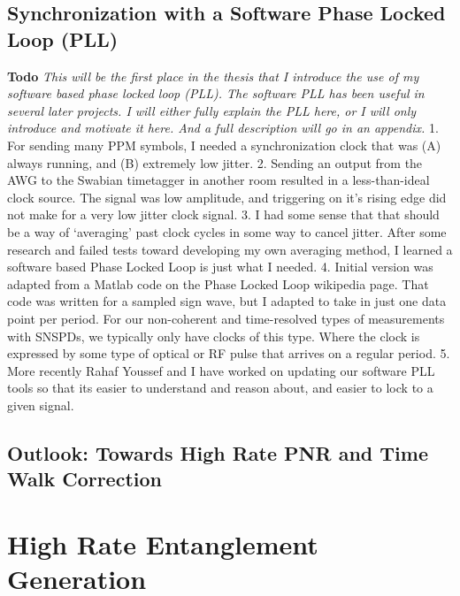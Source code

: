 \documentclass[11pt]{caltech_thesis} %
\begin{document}
{}

\hypertarget{synchronization-with-a-software-phase-locked-loop-pll}{%
\section{Synchronization with a Software Phase Locked Loop
(PLL)}\label{synchronization-with-a-software-phase-locked-loop-pll}}

\textbf{Todo} \emph{This will be the first place in the thesis that I
introduce the use of my software based phase locked loop (PLL). The
software PLL has been useful in several later projects. I will either
fully explain the PLL here, or I will only introduce and motivate it
here. And a full description will go in an appendix. } 1. For sending
many PPM symbols, I needed a synchronization clock that was (A) always
running, and (B) extremely low jitter. 2. Sending an output from the AWG
to the Swabian timetagger in another room resulted in a less-than-ideal
clock source. The signal was low amplitude, and triggering on it's
rising edge did not make for a very low jitter clock signal. 3. I had
some sense that that should be a way of `averaging' past clock cycles in
some way to cancel jitter. After some research and failed tests toward
developing my own averaging method, I learned a software based Phase
Locked Loop is just what I needed. 4. Initial version was adapted from a
Matlab code on the Phase Locked Loop wikipedia page. That code was
written for a sampled sign wave, but I adapted to take in just one data
point per period. For our non-coherent and time-resolved types of
measurements with SNSPDs, we typically only have clocks of this type.
Where the clock is expressed by some type of optical or RF pulse that
arrives on a regular period. 5. More recently Rahaf Youssef and I have
worked on updating our software PLL tools so that its easier to
understand and reason about, and easier to lock to a given signal.

\hypertarget{outlook-towards-high-rate-pnr-and-time-walk-correction}{%
\section{Outlook: Towards High Rate PNR and Time Walk
Correction}\label{outlook-towards-high-rate-pnr-and-time-walk-correction}}

\hypertarget{high-rate-entanglement-generation}{%
\chapter{High Rate Entanglement
Generation}\label{high-rate-entanglement-generation}}
\end{document}
